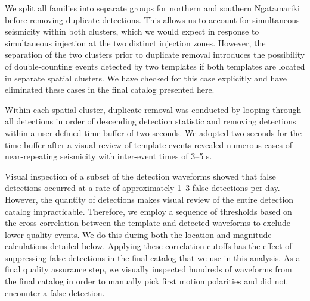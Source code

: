 We split all families into separate groups for northern and southern Ngatamariki
before removing duplicate detections. This allows us to account for simultaneous seismicity within both clusters, which we would expect in response to simultaneous injection at the two distinct injection zones. However, the separation of the two clusters prior to duplicate removal introduces the possibility of double-counting events detected by two templates if both templates are located in separate spatial clusters. We have checked for this case explicitly and have eliminated these cases in the final catalog presented here.

Within each spatial cluster, duplicate removal was conducted by looping through all detections in order of descending detection statistic and removing detections within a user-defined time buffer of two seconds. We adopted two seconds for the time buffer after a visual review of template events revealed
numerous cases of near-repeating seismicity with inter-event times of 3--5 s.

Visual inspection of a subset of the detection waveforms showed that false detections occurred at a rate of approximately 1--3 false detections per day. However, the quantity of detections makes visual review of the entire detection catalog impracticable. Therefore, we employ a sequence of thresholds based on the cross-correlation between the template and detected waveforms to exclude lower-quality events. We do this during both the location and magnitude calculations detailed below. Applying these correlation cutoffs has the effect of suppressing false detections in the final catalog that we use in this analysis. As a final quality assurance step, we visually inspected hundreds of waveforms from the final catalog in order to manually pick first motion polarities and did not encounter a false detection.

